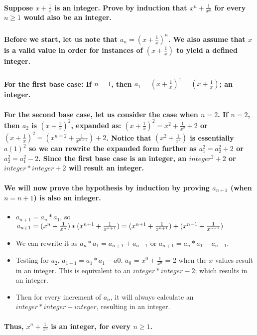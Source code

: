 \documentclass[letterpaper,12pt]{article}
\begin{document}
\paragraph{Suppose $x+\frac{1}{x}$ is an integer. Prove by induction that $x^n + \frac{1}{x^n}$ for every $n\geq1$ would also be an integer. }
\subparagraph{}
\paragraph{Before we start, let us note that $a_{n}=(x + \frac{1}{x})^n$. We also assume that $x$ is a valid value in order for instances of $(x + \frac{1}{x})$ to yield a defined integer. }
\subparagraph{}

\paragraph{For the first base case: If $n=1$, then $a_{1}=(x + \frac{1}{x})^1 = (x + \frac{1}{x})$; an integer. }
\paragraph{For the second base case, let us consider the case when $n = 2$. If $n=2$, then $a_{2}$ is $(x + \frac{1}{x})^2$, expanded as: $(x + \frac{1}{x})^2 = x^2 + \frac{1}{x^2}+2$ or $(x + \frac{1}{x})^2 = (x^{n=2}+\frac{1}{x^{n=2}}) + 2$. Notice that $(x^2 + \frac{1}{x^2})$ is essentially $a(1)^2$ so we can rewrite the expanded form further as $a_{1}^2 = a_{2}^2 + 2$ or $a_{2}^2 = a_{1}^2 - 2$. Since the first base case is an integer, an $integer^2 + 2$ or $integer * integer + 2$ will result an integer. }

\paragraph{We will now prove the hypothesis by induction by proving $a_{n+1}$ (when $n=n+1$) is also an integer. }
\begin{itemize}
\item{$a_{n+1}=a_{n} * a_{1}$, so $a_{n+1}=(x^n + \frac{1}{x^n}) * (x^{n+1} + \frac{1}{x^{n+1}}) = \\\\(x^{n+1}+\frac{1}{x^{n+1}})+(x^{n-1}+\frac{1}{x^{n-1}})$}
\item{We can rewrite it as $a_{n} * a_{1} = a_{n+1} + a_{n-1}$ or $a_{n+1} = a_{n} * a_{1} - a_{n-1}$. }
\item{Testing for $a_{2}$, $a_{1+1} = a_{1}*a_{1}-a{0}$. $a_{0}$ = $x^0 + \frac{1}{x^0}$ = 2 when the $x$ values result in an integer. This is equivalent to an $integer*integer-2$; which results in an integer. }
\item{Then for every increment of $a_{n}$, it will always calculate an $integer*integer-integer$, resulting in an integer. }
\end{itemize}
\paragraph{Thus, $x^n + \frac{1}{x^n}$ is an integer, for every $\textit{n}\geq1$. }
\end{document}
